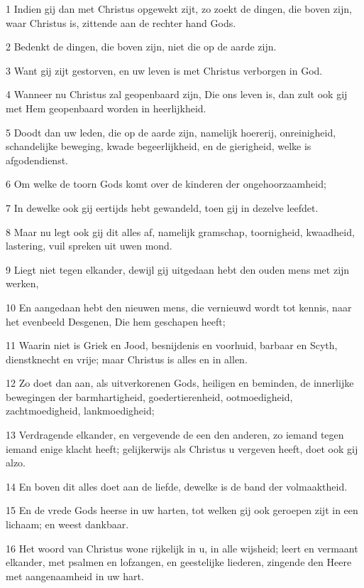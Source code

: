 \par 1 Indien gij dan met Christus opgewekt zijt, zo zoekt de dingen, die boven zijn, waar Christus is, zittende aan de rechter hand Gods.
\par 2 Bedenkt de dingen, die boven zijn, niet die op de aarde zijn.
\par 3 Want gij zijt gestorven, en uw leven is met Christus verborgen in God.
\par 4 Wanneer nu Christus zal geopenbaard zijn, Die ons leven is, dan zult ook gij met Hem geopenbaard worden in heerlijkheid.
\par 5 Doodt dan uw leden, die op de aarde zijn, namelijk hoererij, onreinigheid, schandelijke beweging, kwade begeerlijkheid, en de gierigheid, welke is afgodendienst.
\par 6 Om welke de toorn Gods komt over de kinderen der ongehoorzaamheid;
\par 7 In dewelke ook gij eertijds hebt gewandeld, toen gij in dezelve leefdet.
\par 8 Maar nu legt ook gij dit alles af, namelijk gramschap, toornigheid, kwaadheid, lastering, vuil spreken uit uwen mond.
\par 9 Liegt niet tegen elkander, dewijl gij uitgedaan hebt den ouden mens met zijn werken,
\par 10 En aangedaan hebt den nieuwen mens, die vernieuwd wordt tot kennis, naar het evenbeeld Desgenen, Die hem geschapen heeft;
\par 11 Waarin niet is Griek en Jood, besnijdenis en voorhuid, barbaar en Scyth, dienstknecht en vrije; maar Christus is alles en in allen.
\par 12 Zo doet dan aan, als uitverkorenen Gods, heiligen en beminden, de innerlijke bewegingen der barmhartigheid, goedertierenheid, ootmoedigheid, zachtmoedigheid, lankmoedigheid;
\par 13 Verdragende elkander, en vergevende de een den anderen, zo iemand tegen iemand enige klacht heeft; gelijkerwijs als Christus u vergeven heeft, doet ook gij alzo.
\par 14 En boven dit alles doet aan de liefde, dewelke is de band der volmaaktheid.
\par 15 En de vrede Gods heerse in uw harten, tot welken gij ook geroepen zijt in een lichaam; en weest dankbaar.
\par 16 Het woord van Christus wone rijkelijk in u, in alle wijsheid; leert en vermaant elkander, met psalmen en lofzangen, en geestelijke liederen, zingende den Heere met aangenaamheid in uw hart.
